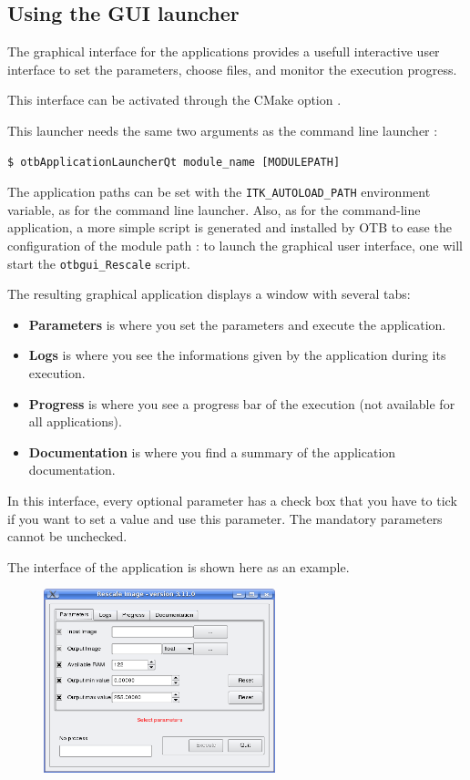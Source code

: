 \subsection{Using the GUI launcher}

The graphical interface for the applications provides a usefull interactive user interface
to set the parameters, choose files, and monitor the execution progress.

This interface can be activated through the CMake option .

This launcher needs the same two arguments as the command line launcher :
\begin{verbatim}
$ otbApplicationLauncherQt module_name [MODULEPATH]
\end{verbatim}

The application paths can be set with the \verb?ITK_AUTOLOAD_PATH? environment variable,
as for the command line launcher.
Also, as for the command-line application, a more simple script is generated and installed by OTB
to ease the configuration of the module path : to launch the  graphical user interface,
one will start the \verb?otbgui_Rescale? script.

The resulting graphical application displays a window with several tabs:
\begin{itemize}
\item \textbf{Parameters} is where you set the parameters and 
execute the application. 
\item \textbf{Logs} is where you see the informations given by 
the application during its execution. 
\item \textbf{Progress} is where you see a progress bar of the 
execution (not available for all applications). 
\item \textbf{Documentation} is where you find a summary of the 
application documentation.
\end{itemize}

In this interface, every optional parameter has a check box that
you have to tick if you want to set a value and use this parameter.
The mandatory parameters cannot be unchecked.
 
The interface of the application  is shown 
here as an example.

\begin{figure}[h]
  \center
  \includegraphics[width=0.6\textwidth]{../Art/QtImages/rescale_param.png}
  \label{fig:rescaleParam}
\end{figure}

